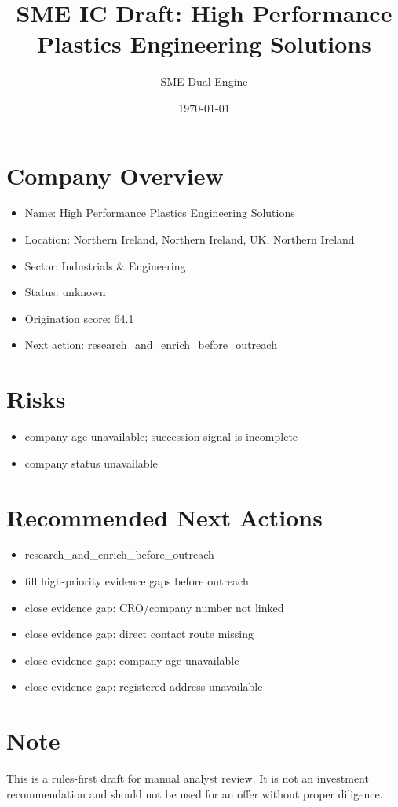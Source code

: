 \documentclass[11pt,a4paper]{article}
\title{SME IC Draft: High Performance Plastics Engineering Solutions}
\author{SME Dual Engine}
\date{\today}
\begin{document}
\maketitle
\section*{Company Overview}
\begin{itemize}[leftmargin=1.4em]
\item Name: High Performance Plastics Engineering Solutions
\item Location: Northern Ireland, Northern Ireland, UK, Northern Ireland
\item Sector: Industrials \& Engineering
\item Status: unknown
\item Origination score: 64.1
\item Next action: research\_and\_enrich\_before\_outreach
\end{itemize}
\section*{Risks}
\begin{itemize}[leftmargin=1.4em]
\item company age unavailable; succession signal is incomplete
\item company status unavailable
\end{itemize}
\section*{Recommended Next Actions}
\begin{itemize}[leftmargin=1.4em]
\item research\_and\_enrich\_before\_outreach
\item fill high-priority evidence gaps before outreach
\item close evidence gap: CRO/company number not linked
\item close evidence gap: direct contact route missing
\item close evidence gap: company age unavailable
\item close evidence gap: registered address unavailable
\end{itemize}
\section*{Note}
This is a rules-first draft for manual analyst review. It is not an investment
recommendation and should not be used for an offer without proper diligence.
\end{document}

